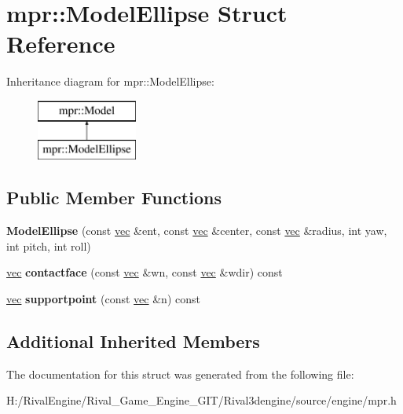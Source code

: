 \hypertarget{structmpr_1_1_model_ellipse}{}\section{mpr\+:\+:Model\+Ellipse Struct Reference}
\label{structmpr_1_1_model_ellipse}
Inheritance diagram for mpr\+:\+:Model\+Ellipse\+:\begin{figure}[H]
\begin{center}
\leavevmode
\includegraphics[height=2.000000cm]{structmpr_1_1_model_ellipse}
\end{center}
\end{figure}
\subsection*{Public Member Functions}
\begin{DoxyCompactItemize}
\item 
\mbox{\label{structmpr_1_1_model_ellipse_ab4f9d408467710217849369bbba5073c}} 
{\bfseries Model\+Ellipse} (const \hyperlink{structvec}{vec} \&ent, const \hyperlink{structvec}{vec} \&center, const \hyperlink{structvec}{vec} \&radius, int yaw, int pitch, int roll)
\item 
\mbox{\label{structmpr_1_1_model_ellipse_a3a9bbd1c1bde7b82196b6da80287d3d9}} 
\hyperlink{structvec}{vec} {\bfseries contactface} (const \hyperlink{structvec}{vec} \&wn, const \hyperlink{structvec}{vec} \&wdir) const
\item 
\mbox{\label{structmpr_1_1_model_ellipse_a2360a7c3ade6760b1c6a631ec20015e6}} 
\hyperlink{structvec}{vec} {\bfseries supportpoint} (const \hyperlink{structvec}{vec} \&n) const
\end{DoxyCompactItemize}
\subsection*{Additional Inherited Members}


The documentation for this struct was generated from the following file\+:\begin{DoxyCompactItemize}
\item 
H\+:/\+Rival\+Engine/\+Rival\+\_\+\+Game\+\_\+\+Engine\+\_\+\+G\+I\+T/\+Rival3dengine/source/engine/mpr.\+h\end{DoxyCompactItemize}
